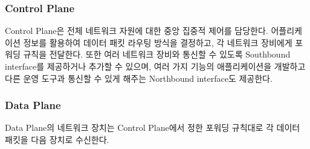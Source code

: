     \subsubsection*{Control Plane}
    Control Plane은 전체 네트워크 자원에 대한 중앙 집중적 제어를 담당한다. 어플리케이션 정보를 활용하여 데이터 패킷 라우팅 방식을 결정하고, 각 네트워크 장비에게 포워딩 규칙을 전달한다. 또한 여러 네트워크 장비와 통신할 수 있도록 Southbound interface를 제공하거나 추가할 수 있으며, 여러 가지 기능의 애플리케이션을 개발하고 다른 운영 도구과 통신할 수 있게 해주는 Northbound interface도 제공한다. \\
    
    \subsubsection*{Data Plane}
    Data Plane의 네트워크 장치는 Control Plane에서 정한 포워딩 규칙대로 각 데이터 패킷을 다음 장치로 수신한다. \\
\newpage